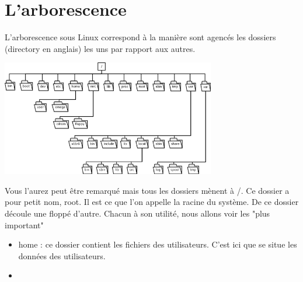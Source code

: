 \chapter{L'arborescence}

L'arborescence sous Linux correspond à la manière sont agencés les dossiers (directory en anglais) les uns par rapport aux autres.

\begin{center}
	\includegraphics[width=0.7\textwidth]{Images/arborescence.png}
\end{center}

Vous l'aurez peut être remarqué mais tous les dossiers mènent à /. Ce dossier a pour petit nom, root. Il est ce que l'on appelle la racine du système. De ce dossier découle une floppé d'autre. Chacun à son utilité, nous allons voir les "plus important"
\begin{itemize}
	\item home : ce dossier contient les fichiers des utilisateurs. C'est ici que se situe les données des utilisateurs.
	\item 
\end{itemize}
